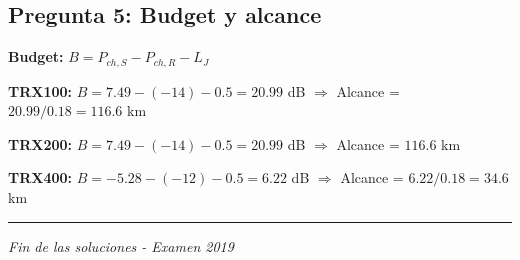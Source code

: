 \documentclass[a4paper,11pt]{article}
\begin{document}
\subsection*{Pregunta 5: Budget y alcance}

\textbf{Budget:} $B = P_{ch,S} - P_{ch,R} - L_J$

\textbf{TRX100:} $B = 7.49 - (-14) - 0.5 = 20.99$ dB $\Rightarrow$ Alcance = $20.99/0.18 = 116.6$ km

\textbf{TRX200:} $B = 7.49 - (-14) - 0.5 = 20.99$ dB $\Rightarrow$ Alcance = $116.6$ km

\textbf{TRX400:} $B = -5.28 - (-12) - 0.5 = 6.22$ dB $\Rightarrow$ Alcance = $6.22/0.18 = 34.6$ km

\vspace{1cm}
\noindent\rule{\textwidth}{0.4pt}

\begin{center}
\textit{Fin de las soluciones - Examen 2019}
\end{center}
\end{document}

